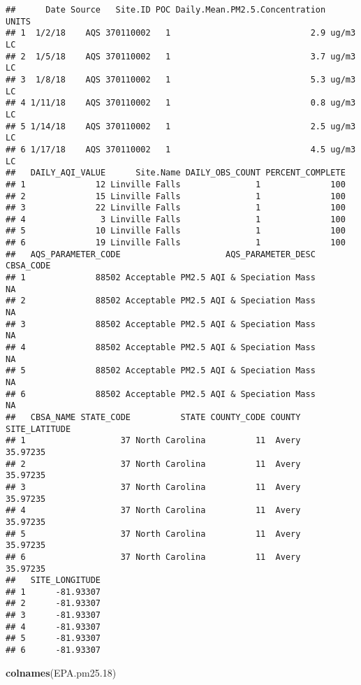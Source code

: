 \documentclass[]{article}
\newenvironment{Shaded}{\begin{snugshade}}{\end{snugshade}}
\newcommand{\KeywordTok}[1]{\textcolor[rgb]{0.13,0.29,0.53}{\textbf{#1}}}
\newcommand{\DecValTok}[1]{\textcolor[rgb]{0.00,0.00,0.81}{#1}}
\newcommand{\NormalTok}[1]{#1}
\begin{document}
\begin{verbatim}
##      Date Source   Site.ID POC Daily.Mean.PM2.5.Concentration    UNITS
## 1  1/2/18    AQS 370110002   1                            2.9 ug/m3 LC
## 2  1/5/18    AQS 370110002   1                            3.7 ug/m3 LC
## 3  1/8/18    AQS 370110002   1                            5.3 ug/m3 LC
## 4 1/11/18    AQS 370110002   1                            0.8 ug/m3 LC
## 5 1/14/18    AQS 370110002   1                            2.5 ug/m3 LC
## 6 1/17/18    AQS 370110002   1                            4.5 ug/m3 LC
##   DAILY_AQI_VALUE      Site.Name DAILY_OBS_COUNT PERCENT_COMPLETE
## 1              12 Linville Falls               1              100
## 2              15 Linville Falls               1              100
## 3              22 Linville Falls               1              100
## 4               3 Linville Falls               1              100
## 5              10 Linville Falls               1              100
## 6              19 Linville Falls               1              100
##   AQS_PARAMETER_CODE                     AQS_PARAMETER_DESC CBSA_CODE
## 1              88502 Acceptable PM2.5 AQI & Speciation Mass        NA
## 2              88502 Acceptable PM2.5 AQI & Speciation Mass        NA
## 3              88502 Acceptable PM2.5 AQI & Speciation Mass        NA
## 4              88502 Acceptable PM2.5 AQI & Speciation Mass        NA
## 5              88502 Acceptable PM2.5 AQI & Speciation Mass        NA
## 6              88502 Acceptable PM2.5 AQI & Speciation Mass        NA
##   CBSA_NAME STATE_CODE          STATE COUNTY_CODE COUNTY SITE_LATITUDE
## 1                   37 North Carolina          11  Avery      35.97235
## 2                   37 North Carolina          11  Avery      35.97235
## 3                   37 North Carolina          11  Avery      35.97235
## 4                   37 North Carolina          11  Avery      35.97235
## 5                   37 North Carolina          11  Avery      35.97235
## 6                   37 North Carolina          11  Avery      35.97235
##   SITE_LONGITUDE
## 1      -81.93307
## 2      -81.93307
## 3      -81.93307
## 4      -81.93307
## 5      -81.93307
## 6      -81.93307
\end{verbatim}

\begin{Shaded}
\begin{Highlighting}[]
\KeywordTok{colnames}\NormalTok{(EPA.pm25.}\DecValTok{18}\NormalTok{)}
\end{Highlighting}
\end{Shaded}
\end{document}
